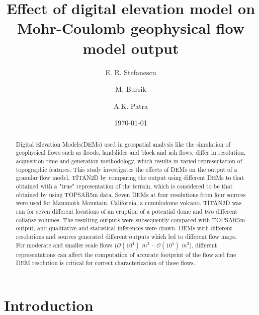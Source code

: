 \documentclass[12pt,letterpaper]{article}
\title{Effect of digital elevation model on Mohr-Coulomb geophysical flow model output}
\author[1]{ E. R. Stefanescu }
\author[2]{M. Bursik}
\author[1]{A.K. Patra}
\affil[1]{Department of Mechanical and Aerospace Engineering, University at Buffalo, Buffalo, NY 14260}
\affil[2]{Department of Geology, University at Buffalo, Buffalo, NY 14260 }
\date{\today}
\begin{document}
\linenumbers
\maketitle

\begin{abstract}
  Digital Elevation Models(DEMs) used in geospatial analysis like the
  simulation of geophysical flows such as floods, landslides and block
  and ash flows, differ in resolution, acquisition time and generation
  methodology, which results in varied representation of topographic
  features. This study investigates the effects of DEMs on the output
  of a granular flow model, TITAN2D by comparing the output using
  different DEMs to that obtained with a "true" representation of the
  terrain, which is considered to be that obtained by using TOPSAR5m
  data. Seven DEMs at four resolutions from four sources were used for
  Mammoth Mountain, California, a cumulodome volcano. TITAN2D was run
  for seven different locations of an eruption of a potential dome and
  two different collapse volumes.  The resulting outputs were
  subsequently compared with TOPSAR5m output, and qualitative and
  statistical inferences were drawn. DEMs with different resolutions
  and sources generated different outputs which led to different flow
  maps. For moderate and smaller scale flows ($\mathcal{O}(10^4)$ 
  $m^3$ -- $\mathcal{O}(10^5)$ $m^3$), different representations
  can affect the computation of accurate footprint of the flow and fine
  DEM resolution is critical for correct characterization of these flows.
\end{abstract}

\section{Introduction}
\end{document}
